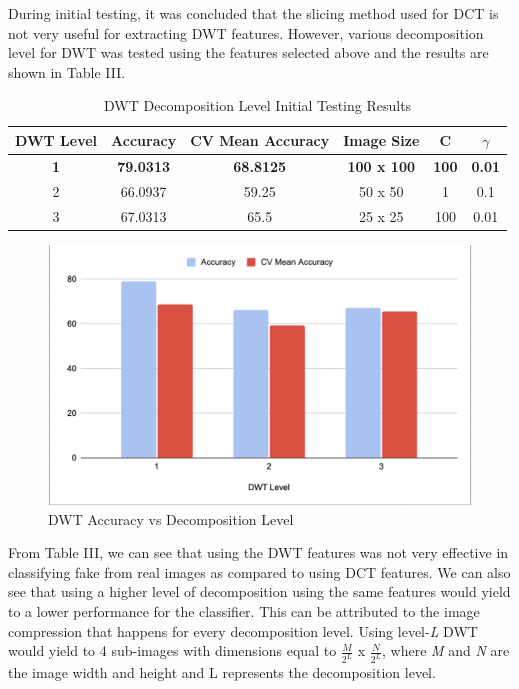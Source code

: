 \documentclass[journal]{./IEEE/IEEEtran}
\begin{document}
During initial testing, it was concluded that the slicing method used for DCT is not very useful for extracting DWT features. However, various decomposition level for DWT was tested using the features selected above and the results are shown in Table III. 

\begin{table}[H]
\centering
\begin{tabular}{|c|c|c|c|c|c|}
\hline
DWT Level  & Accuracy         & CV Mean Accuracy & Image Size         & C            &  $\gamma$          \\ \hline
\textbf{1} & \textbf{79.0313} & \textbf{68.8125} & \textbf{100 x 100} & \textbf{100} & \textbf{0.01} \\ \hline
2          & 66.0937          & 59.25            & 50 x 50            & 1            & 0.1           \\ \hline
3          & 67.0313          & 65.5             & 25 x 25            & 100          & 0.01          \\ \hline
\end{tabular}
\caption{DWT Decomposition Level Initial Testing Results}
\end{table}

\begin{figure}[!ht]
    \centering
    \includegraphics{imgs/dwt_level.png}
    \caption{DWT Accuracy vs Decomposition Level}
    \label{fig:enter-label}
\end{figure}

From Table III, we can see that using the DWT features was not very effective in classifying fake from real images as compared to using DCT features. We can also see that using a higher level of decomposition using the same features would yield to a lower performance for the classifier. This can be attributed to the image compression that happens for every decomposition level. Using level-\textit{L} DWT would yield to 4 sub-images with dimensions equal to \( \frac{M}{2^L} \) x \( \frac{N}{2^L} \), where \textit{M} and \textit{N} are the image width and height and L represents the decomposition level.
\end{document}
